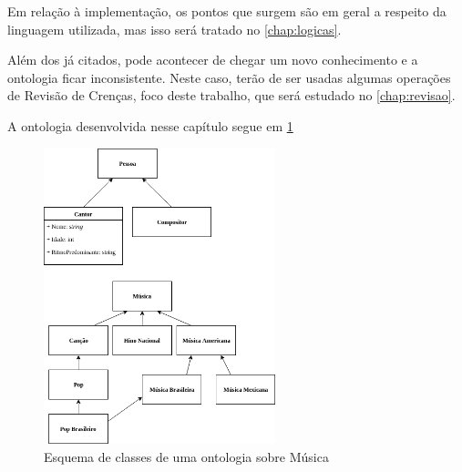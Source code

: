Em relação à implementação, os pontos que surgem são em geral a respeito da linguagem utilizada, mas isso será tratado no \autoref{chap:logicas}.

Além dos já citados, pode acontecer de chegar um novo conhecimento e a ontologia ficar inconsistente. Neste caso, terão de ser usadas algumas operações de Revisão de Crenças, foco deste trabalho, que será estudado no \autoref{chap:revisao}.

A ontologia desenvolvida nesse capítulo segue em \ref{img:Esquema}

\begin{figure}
	\centering
	\includegraphics[width=0.6\textwidth]{Capitulos/Ontologias/OntologiaMusica}
	\caption{Esquema de classes de uma ontologia sobre Música}
	\label{img:Esquema}
\end{figure}